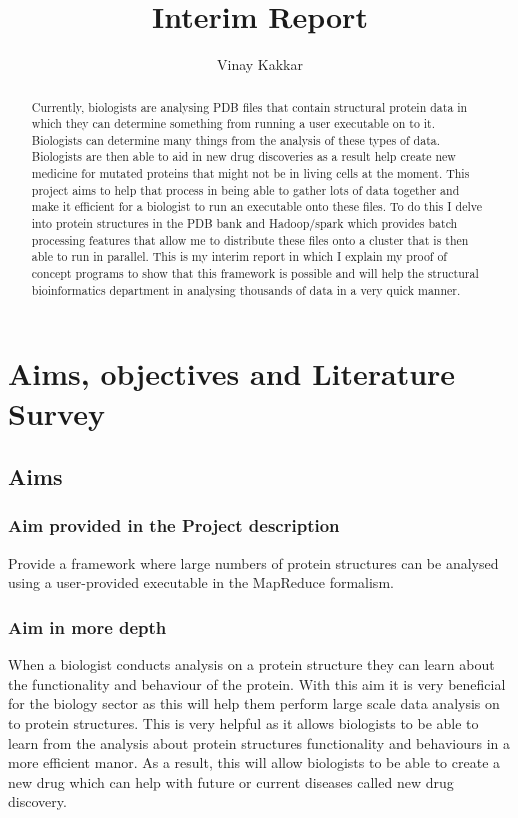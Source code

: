 \documentclass{report}
\title{Interim Report}
\author{Vinay Kakkar}
\begin{document}
\maketitle

\tableofcontents

\begin{abstract}
    Currently, biologists are analysing PDB files that contain structural protein data in which they can determine something from running a user executable on to it. Biologists can determine many things from the analysis of these types of data. Biologists are then able to aid in new drug discoveries as a result help create new medicine for mutated proteins that might not be in living cells at the moment. This project aims to help that process in being able to gather lots of data together and make it efficient for a biologist to run an executable onto these files. To do this I delve into protein structures in the PDB bank and Hadoop/spark which provides batch processing features that allow me to distribute these files onto a cluster that is then able to run in parallel. This is my interim report in which I explain my proof of concept programs to show that this framework is possible and will help the structural bioinformatics department in analysing thousands of data in a very quick manner.

\end{abstract}

\renewcommand\thesection{\arabic{section}}

\section{Aims, objectives and Literature Survey}

\subsection{Aims}
\subsubsection{Aim provided in the Project description} 

Provide a framework where large numbers of protein structures can be analysed using a user-provided executable in the MapReduce formalism.

\subsubsection{Aim in more depth}
When a biologist conducts analysis on a protein structure they can learn about the functionality and behaviour of the protein. With this aim it is very beneficial for the biology sector as this will help them perform large scale data analysis on to protein structures. This is very helpful as it allows biologists to be able to learn from the analysis about protein structures functionality and behaviours in a more efficient manor. As a result, this will allow biologists to be able to create a new drug which can help with future or current diseases called new drug discovery. 
\end{document}
